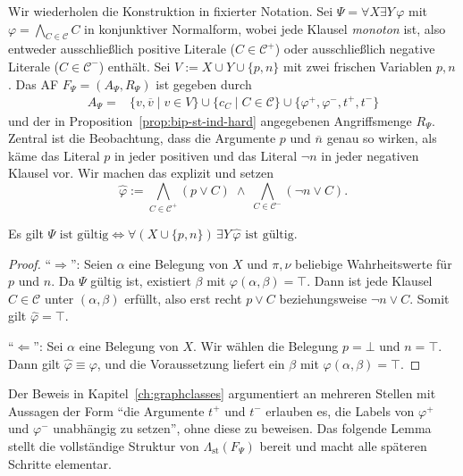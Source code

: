Wir wiederholen die Konstruktion in fixierter Notation. Sei
\(\Psi=\forall X\exists Y\,\varphi\) mit
\(\varphi=\bigwedge_{C\in\mathcal{C}}C\) in konjunktiver Normalform, wobei jede
Klausel \emph{monoton} ist, also entweder ausschließlich positive Literale
(\(C\in\mathcal{C}^{+}\)) oder ausschließlich negative Literale
(\(C\in\mathcal{C}^{-}\)) enthält. Sei \(V:=X\cup Y\cup\{p,n\}\) mit zwei
frischen Variablen \(p,n\). Das AF \(F_\Psi=(A_\Psi,R_\Psi)\) ist gegeben durch
\[
\begin{aligned}
    A_{\Psi}
    ={}&
    \{v,\overline{v}\mid v\in V\}
    \cup
    \{c_C\mid C\in\mathcal{C}\}
    \cup
    \{\varphi^{+},\varphi^{-},t^{+},t^{-}\}
\end{aligned}
\]
und der in Proposition~\ref{prop:bip-st-ind-hard} angegebenen Angriffsmenge
\(R_\Psi\). Zentral ist die Beobachtung, dass die Argumente \(p\) und
\(\overline{n}\) genau so wirken, als käme das Literal \(p\) in jeder positiven
und das Literal \(\neg n\) in jeder negativen Klausel vor. Wir machen das
explizit und setzen
\[
    \widehat{\varphi}
    :=
    \bigwedge_{C\in\mathcal{C}^{+}}(p\lor C)
    \;\land\;
    \bigwedge_{C\in\mathcal{C}^{-}}(\neg n\lor C).
\]

\begin{Lemma}
    \label{lem:bip-qbf-aequiv}
    Es gilt
    \(
        \Psi\text{ ist gültig}
        \iff
        \forall (X\cup\{p,n\})\,\exists Y\,\widehat{\varphi}
        \text{ ist gültig.}
    \)
\end{Lemma}

\begin{proof}
    \enquote{\(\Rightarrow\)}: Seien \(\alpha\) eine Belegung von \(X\) und
    \(\pi,\nu\) beliebige Wahrheitswerte für \(p\) und \(n\). Da \(\Psi\)
    gültig ist, existiert \(\beta\) mit \(\varphi(\alpha,\beta)=\top\). Dann ist
    jede Klausel \(C\in\mathcal{C}\) unter \((\alpha,\beta)\) erfüllt, also erst
    recht \(p\lor C\) beziehungsweise \(\neg n\lor C\). Somit gilt
    \(\widehat{\varphi}=\top\).

    \enquote{\(\Leftarrow\)}: Sei \(\alpha\) eine Belegung von \(X\). Wir wählen
    die Belegung \(p=\bot\) und \(n=\top\). Dann gilt
    \(\widehat{\varphi}\equiv\varphi\), und die Voraussetzung liefert ein
    \(\beta\) mit \(\varphi(\alpha,\beta)=\top\).
\end{proof}

Der Beweis in Kapitel~\ref{ch:graphclasses} argumentiert an mehreren Stellen mit
Aussagen der Form \enquote{die Argumente \(t^{+}\) und \(t^{-}\) erlauben es,
die Labels von \(\varphi^{+}\) und \(\varphi^{-}\) unabhängig zu setzen}, ohne
diese zu beweisen. Das folgende Lemma stellt die vollständige Struktur von
\(\Lambda_{\mathrm{st}}(F_\Psi)\) bereit und macht alle späteren Schritte
elementar.

